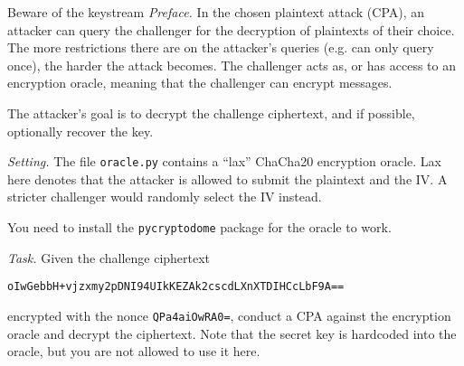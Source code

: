\documentclass{practice}
\begin{document}
\begin{task}{Beware of the keystream}
  \textit{Preface.}
  In the chosen plaintext attack (CPA), an attacker can query the challenger for the decryption of plaintexts of their choice.
  The more restrictions there are on the attacker's queries (e.g. can only query once), the harder the attack becomes.
  The challenger acts as, or has access to an encryption oracle, meaning that the challenger can encrypt messages.

  The attacker's goal is to decrypt the challenge ciphertext, and if possible, optionally recover the key.

  \textit{Setting.}
  The file \texttt{oracle.py} contains a \enquote{lax} ChaCha20 encryption oracle.
  Lax here denotes that the attacker is allowed to submit the plaintext and the IV.
  A stricter challenger would randomly select the IV instead.

  You need to install the \texttt{pycryptodome}\footnotemark{} package for the oracle to work.

  \textit{Task.}
  Given the challenge ciphertext
  \begin{Verbatim}
oIwGebbH+vjzxmy2pDNI94UIkKEZAk2cscdLXnXTDIHCcLbF9A==
  \end{Verbatim}
  encrypted with the nonce \texttt{QPa4aiOwRA0=}, conduct a CPA against the encryption oracle and decrypt the ciphertext.
  Note that the secret key is hardcoded into the oracle, but you are not allowed to use it here.
\end{task}
\end{document}
